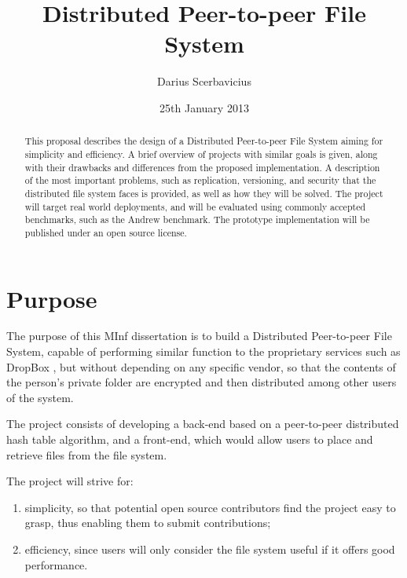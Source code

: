 \documentclass[8pt,a4paper]{article}
\title{Distributed Peer-to-peer File System}
\author{Darius Scerbavicius}
\date{25th January 2013}
\begin{document}
\maketitle

\begin{abstract}
This proposal describes the design of a Distributed Peer-to-peer File System aiming for simplicity and efficiency. A brief overview of projects with similar goals is given, along with their drawbacks and differences from the proposed implementation. A description of the most important problems, such as replication, versioning, and security that the distributed file system faces is provided, as well as how they will be solved. The project will target real world deployments, and will be evaluated using commonly accepted benchmarks, such as the Andrew benchmark. The prototype implementation will be published under an open source license.
\end{abstract}

%
%
%
%

\section{Purpose}
The purpose of this MInf dissertation is to build a Distributed Peer-to-peer File System, capable of performing similar function to the proprietary services such as DropBox \cite{dropbox}, but without depending on any specific vendor, so that the contents of the person's private folder are encrypted and then distributed among other users of the system. 

The project consists of developing a back-end based on a peer-to-peer distributed hash table algorithm, and a front-end, which would allow users to place and retrieve files from the file system.

The project will strive for:
\begin{enumerate}
\item simplicity, so that potential open source contributors find the project easy to grasp, thus enabling them to submit contributions;
\item efficiency, since users will only consider the file system useful if it offers good performance.
\end{enumerate}
\end{document}
